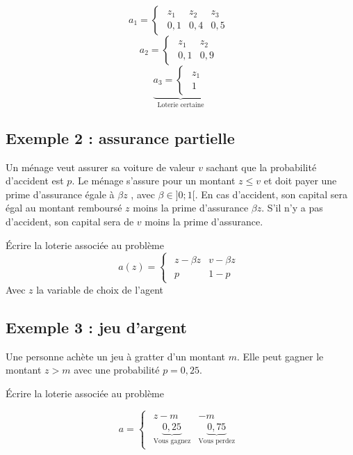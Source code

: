 \documentclass[a4paper, 12pt]{report}
\begin{document}
$$
a_1=\begin{cases}
	\begin{matrix}z_1 & z_2 & z_3 \\ 0,1 & 0,4 & 0,5 \end{matrix}
\end{cases}
$$
$$
a_2=\begin{cases}
	\begin{matrix}z_1 & z_2 \\ 0,1 & 0,9 \end{matrix}
\end{cases}
$$
$$
\underbrace{a_3=\begin{cases}
		\begin{matrix}z_1 \\ 1 \end{matrix}
\end{cases}}_ {\text{Loterie certaine}}
$$

\subsection{Exemple 2 : assurance partielle}

Un ménage veut assurer sa voiture de valeur $v$ sachant que la probabilité d'accident est $p$. Le ménage s'assure pour un montant $z\le v$ et doit payer une prime d'assurance égale à $\beta z$ , avec $\beta \in ]0;1[$. En cas d'accident, son capital sera égal au montant remboursé $z$ moins la prime d'assurance $\beta z$. S'il n'y a pas d'accident, son capital sera de $v$ moins la prime d'assurance.

Écrire la loterie associée au problème
$$
a(z)=\begin{cases}
	\begin{matrix}z-\beta z & v-\beta z \\ p & 1-p \end{matrix}
\end{cases}
$$
Avec $z$ la variable de choix de l'agent

\subsection{Exemple 3 : jeu d'argent}

Une personne achète un jeu à gratter d'un montant $m$. Elle peut gagner le montant $z>m$ avec une probabilité $p = 0,25$.

Écrire la loterie associée au problème

$$
a=\begin{cases}
	\begin{matrix}z-m & -m \\ \underbrace{0,25}_{\text{Vous gagnez}}& \underbrace{0,75}_{\text{Vous perdez}}\end{matrix}
\end{cases}
$$
\end{document}
